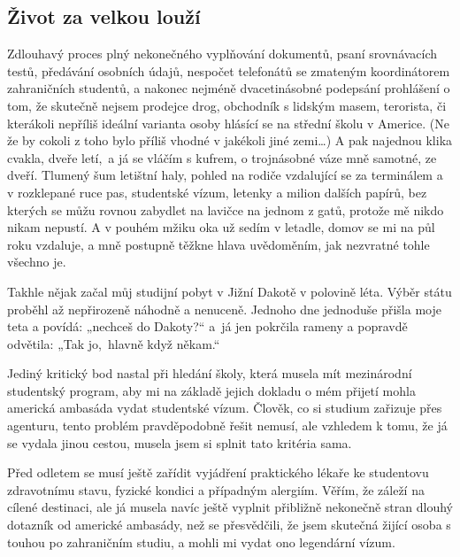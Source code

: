 \documentclass[12pt, a4paper]{article}
\begin{document}
    \begin{multicols*}{2}
        \setlength{\columnseprule}{1pt}
        \begin{center}\section*{Život za velkou louží}\end{center}

        Zdlouhavý proces plný nekonečného vyplňování dokumentů, psaní srovnávacích testů, předávání osobních údajů, nespočet telefonátů se zmateným koordinátorem zahraničních studentů, a nakonec nejméně dvacetinásobné podepsání prohlášení o tom, že skutečně nejsem prodejce drog, obchodník s lidským masem, terorista, či kterákoli nepříliš ideální varianta osoby hlásící se na střední školu v Americe. (Ne že by cokoli z toho bylo příliš vhodné v jakékoli jiné zemi…)  A pak najednou klika cvakla, dveře letí,~a já se vláčím s kufrem, o trojnásobné váze mně samotné, ze dveří. Tlumený šum letištní haly, pohled na rodiče vzdalující se za terminálem a v rozklepané ruce pas, studentské vízum, letenky a milion dalších papírů, bez kterých se můžu rovnou zabydlet na lavičce na jednom z gatů, protože mě nikdo nikam nepustí. A v pouhém mžiku oka už sedím v letadle, domov se mi na půl roku vzdaluje, a mně postupně těžkne hlava uvědoměním, jak nezvratné tohle všechno je.

        Takhle nějak začal můj studijní pobyt v Jižní Dakotě v polovině léta. Výběr státu proběhl až nepřirozeně náhodně a nenuceně. Jednoho dne jednoduše přišla moje teta a povídá: „nechceš do Dakoty?“ a~já jen pokrčila rameny a popravdě odvětila: „Tak jo,~hlavně když někam.“

        Jediný kritický bod nastal při hledání školy, která musela mít mezinárodní studentský program, aby mi na základě jejich dokladu o mém přijetí mohla americká ambasáda vydat studentské vízum. Člověk, co si studium zařizuje přes agenturu, tento problém pravděpodobně řešit nemusí, ale vzhledem k tomu, že já se vydala jinou cestou, musela jsem si splnit tato kritéria sama.

        Před odletem se musí ještě zařídit vyjádření praktického lékaře ke studentovu zdravotnímu stavu, fyzické kondici a případným alergiím. Věřím, že záleží na cílené destinaci, ale já musela navíc ještě vyplnit přibližně nekonečně stran dlouhý dotazník od americké ambasády, než se přesvědčili, že jsem skutečná žijící osoba s touhou po zahraničním studiu, a mohli mi vydat ono legendární vízum.


\end{multicols*}
\end{document}

